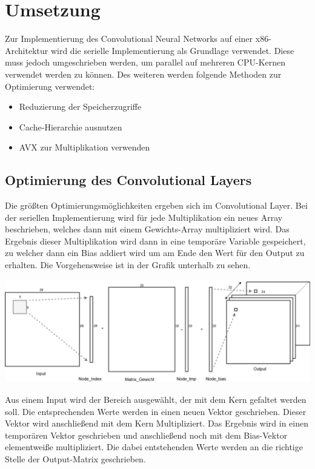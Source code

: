 \documentclass[../main.tex]{subfiles}
\begin{document}
\section{Umsetzung}

Zur Implementierung des Convolutional Neural Networks auf einer x86-Architektur wird die serielle Implementierung als Grundlage verwendet. Diese muss jedoch umgeschrieben werden, um parallel auf mehreren CPU-Kernen verwendet werden zu können. Des weiteren werden folgende Methoden zur Optimierung verwendet:
\begin{itemize}
	\item Reduzierung der Speicherzugriffe
	\item Cache-Hierarchie ausnutzen
	\item AVX zur Multiplikation verwenden
\end{itemize}

\subsection{Optimierung des Convolutional Layers}

Die größten Optimierungsmöglichkeiten ergeben sich im Convolutional Layer. Bei der seriellen Implementierung wird für jede Multiplikation ein neues Array beschrieben, welches dann mit einem Gewichts-Array multipliziert wird. Das Ergebnis dieser Multiplikation wird dann in eine temporäre Variable gespeichert, zu welcher dann ein Bias addiert wird um am Ende den Wert für den Output zu erhalten. Die Vorgehensweise ist in der Grafik unterhalb zu sehen.

\includegraphics[width=\textwidth]{../images/Benz/Conv_Layer_Seriel.png} %

Aus einem Input wird der Bereich ausgewählt, der mit dem Kern gefaltet werden soll. Die entsprechenden Werte werden in einen neuen Vektor geschrieben. Dieser Vektor wird anschließend mit dem Kern Multipliziert. Das Ergebnis wird in einen temporären Vektor geschrieben und anschließend noch mit dem Bias-Vektor elementweiße multipliziert. Die dabei entstehenden Werte werden an die richtige Stelle der Output-Matrix geschrieben.
\end{document}
